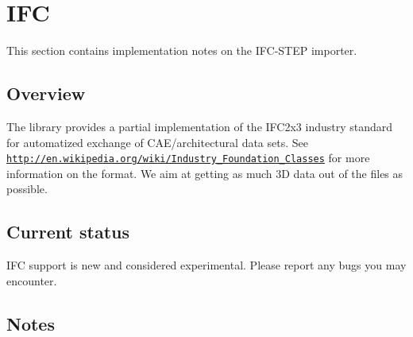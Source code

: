  \hypertarget{importer_notes_ifc}{}\section{I\+F\+C}\label{importer_notes_ifc}
This section contains implementation notes on the I\+F\+C-\/\+S\+T\+E\+P importer. \hypertarget{importer_notes_ifc_overview}{}\subsection{Overview}\label{importer_notes_ifc_overview}
The library provides a partial implementation of the I\+F\+C2x3 industry standard for automatized exchange of C\+A\+E/architectural data sets. See \href{http://en.wikipedia.org/wiki/Industry_Foundation_Classes}{\tt http\+://en.\+wikipedia.\+org/wiki/\+Industry\+\_\+\+Foundation\+\_\+\+Classes} for more information on the format. We aim at getting as much 3\+D data out of the files as possible.\hypertarget{importer_notes_ifc_status}{}\subsection{Current status}\label{importer_notes_ifc_status}
I\+F\+C support is new and considered experimental. Please report any bugs you may encounter.\hypertarget{importer_notes_ifc_notes}{}\subsection{Notes}\label{importer_notes_ifc_notes}

